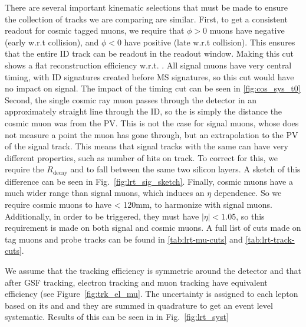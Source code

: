 There are several important kinematic selections that must be made to ensure the collection of tracks we are comparing are similar. First, to get a consistent readout for cosmic tagged muons, we require that $\phi > 0$ muons have negative \tavg (early w.r.t collision), and $\phi < 0$ have positive \tavg (late w.r.t collision). This ensures that the entire \ac{ID} track can be readout in the readout window. Making this cut shows a flat reconstruction efficiency w.r.t. \tavg. All signal muons have very central timing, with \ac{ID} signatures created before \ac{MS} signatures, so this cut would have no impact on signal. The impact of the timing cut can be seen in \autoref{fig:cos_sys_t0} Second, the single cosmic ray muon passes through the detector in an approximately straight line through the ID, so the \dz is simply the distance the cosmic muon was from the PV. This is not the case for signal muons, whose \dz does not measure a point the muon has gone through, but an extrapolation to the PV of the signal track. This means that signal tracks with the same \dz can have very different properties, such as number of hits on track. To correct for this, we require the $R_{\textrm{decay}}$ and \dz to fall between the same two silicon layers. A sketch of this difference can be seen in Fig.~\ref{fig:lrt_sig_sketch}. Finally, cosmic muons have a much wider \z range than signal muons, which induces an $\eta$ dependence. So we require cosmic muons to have \absz < 120mm, to harmonize with signal muons. Additionally, in order to be triggered, they must have $|\eta| < 1.05$, so this requirement is made on both signal and cosmic muons. A full list of cuts made on tag muons and probe tracks can be found in \autoref{tab:lrt-mu-cuts} and \autoref{tab:lrt-track-cuts}.

 
We assume that the tracking efficiency is symmetric around the detector and that after GSF tracking, electron tracking and muon tracking have equivalent efficiency (see Figure~\ref{fig:trk_el_mu}. The uncertainty is assigned to each lepton based on its \pt and \absdz and they are summed in quadrature to get an event level systematic. Results of this can be seen in in Fig.~\ref{fig:lrt_syst}




